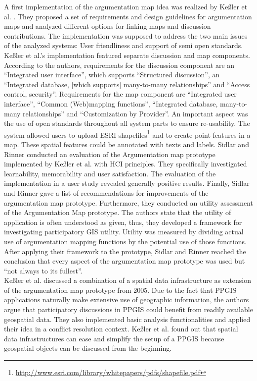 A first implementation of the argumentation map idea was realized by Ke{\ss}ler et al. \cite{Kessler2005_ArgumentationMapPrototype}. They proposed a set of requirements and design guidelines for argumentation maps and analyzed different options for linking maps and discussion contributions. The implementation was supposed to address the two main issues of the analyzed systems: User friendliness and support of semi open standards. Ke{\ss}ler et al.'s implementation featured separate discussion and map components. According to the authors, requirements for the discussion component are an ``Integrated user interface'', which supports ``Structured discussion'', an ``Integrated database, [which supports] many-to-many relationships'' and ``Access control, security''. Requirements for the map component are ``Integrated user interface'', ``Common (Web)mapping functions'', ``Integrated database, many-to-many relationships'' and ``Customization by Provider''. An important aspect was the use of open standards throughout all system parts to ensure re-usability. The system allowed users to upload ESRI shapefiles\footnote{\url{http://www.esri.com/library/whitepapers/pdfs/shapefile.pdf}} and to create point features in a map. These spatial features could be annotated with texts and labels. Sidlar and Rinner \cite{sidlar_argumap_2007} conducted an evaluation of the Argumentation map prototype implemented by Ke{\ss}ler et al. with HCI principles. They specifically investigated learnability, memorability and user satisfaction. The evaluation of the implementation in a user study revealed generally positive results. Finally, Sidlar and Rinner gave a list of recommendations for improvements of the argumentation map prototype. Furthermore, they conducted an utility assessment \cite{Sidlar2009-AssessmentMapGeocollaborationTool} of the Argumentation Map prototype. The authors state that the utility of application is often understood as given, thus, they developed a framework for investigating participatory GIS utility. Utility was measured by dividing actual use of argumentation mapping functions by the potential use of those functions. After applying their framework to the prototype, Sidlar and Rinner reached the conclusion that every aspect of the argumentation map prototype was used but ``not always to its fullest''. \\
Ke{\ss}ler et al. \cite{Kessler2005_Conflict_Resolution} discussed a combination of a spatial data infrastructure as extension of the argumentation map prototype from 2005. Due to the fact that PPGIS applications naturally make extensive use of geographic information, the authors argue that participatory discussions in PPGIS could benefit from readily available geospatial data. They also implemented basic analysis functionalities and applied their idea in a conflict resolution context. Ke{\ss}ler et al. found out that spatial data infrastructures can ease and simplify the setup of a PPGIS because geospatial objects can be discussed from the beginning.\\
